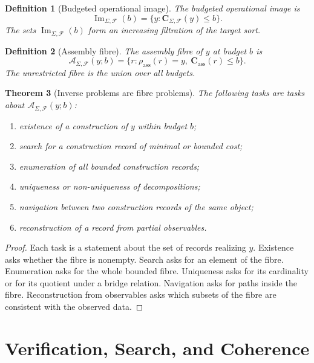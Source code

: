 \documentclass[11pt]{article}
\newtheorem{theorem}{Theorem}[section]
\newtheorem{definition}[theorem]{Definition}
\begin{document}
\begin{definition}[Budgeted operational image]
The budgeted operational image is
\[
\operatorname{Im}_{\Sigma,\mathcal F}(b)
=
\{y:\mathbf C_{\Sigma,\mathcal F}(y)\le b\}.
\]
The sets \(\operatorname{Im}_{\Sigma,\mathcal F}(b)\) form an increasing filtration of the target sort.
\end{definition}

\begin{definition}[Assembly fibre]
The assembly fibre of \(y\) at budget \(b\) is
\[
\mathcal A_{\Sigma,\mathcal F}(y;b)
=
\{r:\rho_{\operatorname{ass}}(r)=y,\ \mathbf C_{\operatorname{ass}}(r)\le b\}.
\]
The unrestricted fibre is the union over all budgets.
\end{definition}

\begin{theorem}[Inverse problems are fibre problems]
The following tasks are tasks about \(\mathcal A_{\Sigma,\mathcal F}(y;b)\):
\begin{enumerate}[leftmargin=2em]
\item existence of a construction of \(y\) within budget \(b\);
\item search for a construction record of minimal or bounded cost;
\item enumeration of all bounded construction records;
\item uniqueness or non-uniqueness of decompositions;
\item navigation between two construction records of the same object;
\item reconstruction of a record from partial observables.
\end{enumerate}
\end{theorem}

\begin{proof}
Each task is a statement about the set of records realizing \(y\).  Existence asks whether the fibre is nonempty.  Search asks for an element of the fibre.  Enumeration asks for the whole bounded fibre.  Uniqueness asks for its cardinality or for its quotient under a bridge relation.  Navigation asks for paths inside the fibre.  Reconstruction from observables asks which subsets of the fibre are consistent with the observed data.
\end{proof}

\section{Verification, Search, and Coherence}
\end{document}
